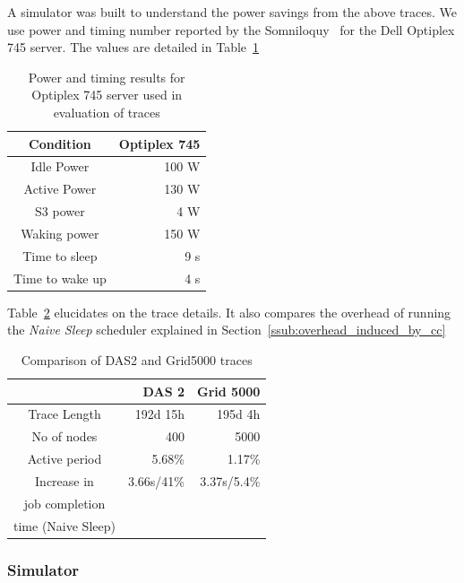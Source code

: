 A simulator was built to understand the power savings from the above traces. We use power and timing number reported by the Somniloquy~\cite{Yuvraj:09} for the Dell Optiplex 745 server. The values are detailed in Table~\ref{tab:optiplex}
\begin{table}[tp]
    \label{tab:optiplex}
    \centering
    \begin{tabular}{|c|r|}
        \hline
        {\bf Condition} & {\bf Optiplex 745}\\
        \hline
        Idle Power & 100 W\\
        \hline
        Active Power & 130 W\\
        \hline
        S3 power & 4 W\\
        \hline
        Waking power & 150 W\\
        \hline
        Time to sleep & 9 s\\
        \hline
        Time to wake up & 4 s\\
        \hline
    \end{tabular}
    \caption{Power and timing results for Optiplex 745 server used in evaluation of traces}
\end{table}

Table~\ref{tab:trace-comp} elucidates on the trace details. It also compares the overhead of running the \emph{Naive Sleep} scheduler explained in Section~\ref{ssub:overhead_induced_by_cc}

\begin{table}
    \centering
    \label{tab:trace-comp}
    \begin{tabular}{|c|r|r|}
        \hline
        & {\bf DAS 2} & {\bf Grid 5000} \\
        \hline
        Trace Length & 192d 15h & 195d 4h\\
        \hline
        No of nodes & 400 & 5000 \\
        \hline
        Active period & 5.68\% & 1.17\% \\
        \hline
        Increase in & 3.66s/41\% & 3.37s/5.4\%\\
        job completion & & \\
        time (Naive Sleep) & &\\
        \hline
    \end{tabular}
    \caption{Comparison of DAS2 and Grid5000 traces}
\end{table}


\subsubsection{Simulator} %
\label{sub:trace_driven_simulation}

